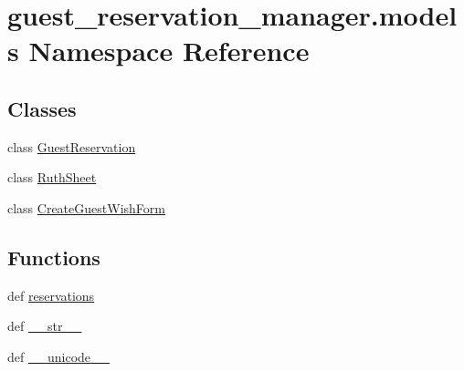 \hypertarget{namespaceguest__reservation__manager_1_1models}{\section{guest\-\_\-reservation\-\_\-manager.\-models Namespace Reference}
\label{namespaceguest__reservation__manager_1_1models}
}
\subsection*{Classes}
\begin{DoxyCompactItemize}
\item 
class \hyperlink{classguest__reservation__manager_1_1models_1_1GuestReservation}{Guest\-Reservation}
\item 
class \hyperlink{classguest__reservation__manager_1_1models_1_1RuthSheet}{Ruth\-Sheet}
\item 
class \hyperlink{classguest__reservation__manager_1_1models_1_1CreateGuestWishForm}{Create\-Guest\-Wish\-Form}
\end{DoxyCompactItemize}
\subsection*{Functions}
\begin{DoxyCompactItemize}
\item 
def \hyperlink{namespaceguest__reservation__manager_1_1models_a2fe994ec5a49cf2d57e07e2249b37931}{reservations}
\item 
def \hyperlink{namespaceguest__reservation__manager_1_1models_a27e53ca580bfd1120b0ce063ee8ba8e5}{\-\_\-\-\_\-str\-\_\-\-\_\-}
\item 
def \hyperlink{namespaceguest__reservation__manager_1_1models_afc5cdb1305900bc8db860c1736b35354}{\-\_\-\-\_\-unicode\-\_\-\-\_\-}
\end{DoxyCompactItemize}
